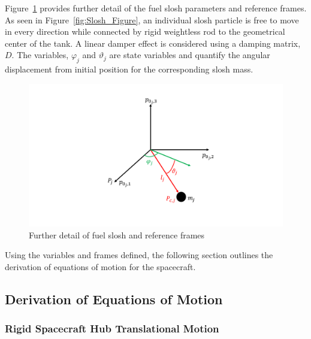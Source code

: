 Figure~\ref{fig:Slosh_Detailed} provides further detail of the fuel slosh parameters and reference frames. As seen in Figure~\ref{fig:Slosh_Figure}, an individual slosh particle is free to move in every direction while connected by rigid weightless rod to the geometrical center of the tank. A linear damper effect is considered using a damping matrix, $D$. The variables, $\varphi_j$ and $\vartheta_j$ are state variables and quantify the angular displacement from initial position for the corresponding slosh mass. 

\begin{figure}[ht]
	\centering
	
	\includegraphics[width=13cm]{Figures/referencesystems.pdf}
	\caption{Further detail of fuel slosh and reference frames}
	\label{fig:Slosh_Detailed}
\end{figure}

Using the variables and frames defined, the following section outlines the derivation of equations of motion for the spacecraft.

\subsection{Derivation of Equations of Motion}

\subsubsection{Rigid Spacecraft Hub Translational Motion}

